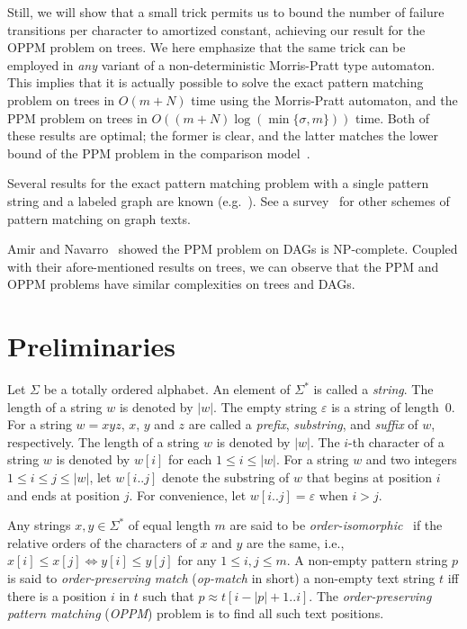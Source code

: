 \documentclass[a4paper,11pt]{article}
\begin{document}
Still, we will show that a small trick permits us to bound the
number of failure transitions per character to amortized constant,
achieving our result for the OPPM problem on trees.
We here emphasize that the same trick can be employed in
\emph{any} variant of a non-deterministic Morris-Pratt type automaton.
This implies that it is actually possible to
solve the exact pattern matching problem on trees in $O(m+N)$ time
using the Morris-Pratt automaton,
and the PPM problem on trees in $O((m+N) \log(\min\{\sigma, m\}))$ time.
Both of these results are optimal;
the former is clear, and the latter matches the lower bound of the PPM problem
in the comparison model~\cite{AmirN09}.

Several results for the exact pattern matching problem
with a single pattern string and a labeled graph are known
(e.g.~\cite{ParkK95,AmirLL00}).
See a survey~\cite{AmirLL14} for other schemes of pattern matching
on graph texts.

Amir and Navarro~\cite{AmirN09} showed 
the PPM problem on DAGs is NP-complete.
Coupled with their afore-mentioned results on trees,
we can observe that
the PPM and OPPM problems have similar complexities on trees and DAGs.



\section{Preliminaries}

Let $\Sigma$ be a totally ordered alphabet.
An element of $\Sigma^*$ is called a {\em string}.
The length of a string $w$ is denoted by $|w|$.
The empty string $\varepsilon$ is a string of length~$0$.
For a string $w = x y z$, $x$, $y$ and $z$ are called
a \emph{prefix}, \emph{substring}, and \emph{suffix} of $w$, respectively.
The length of a string $w$ is denoted by $|w|$.
The $i$-th character of a string $w$ is denoted by $w[i]$ for each $1 \leq i \leq |w|$.
For a string $w$ and two integers $1 \leq i \leq j \leq |w|$,
let $w[i..j]$ denote the substring of $w$ that begins at position $i$ and ends at
position $j$. For convenience, let $w[i..j] = \varepsilon$ when $i > j$.

Any strings $x, y \in \Sigma^*$ of equal length $m$
are said to be \emph{order-isomorphic}~\cite{KubicaKRRW13} if
the relative orders of the characters of $x$ and $y$ are the same,
i.e., $x[i] \le x[j] \iff y[i] \le y[j]$ for any $1 \leq i,j \leq m$.
A non-empty pattern string $p$ is said to \emph{order-preserving match}
(\emph{op-match} in short)
a non-empty text string $t$ iff
there is a position $i$ in $t$ such that $p \approx t[i-|p|+1..i]$.
The \emph{order-preserving pattern matching} (\emph{OPPM}) problem
is to find all such text positions.
\end{document}
